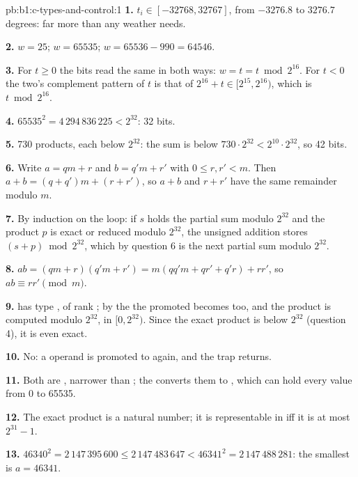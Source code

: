 \begin{solution}{pb:b1:c-types-and-control:1}
\textbf{1.} $t_i \in [-32768, 32767]$, from $-3276.8$ to $3276.7$ degrees: far more than any weather needs.

\textbf{2.} $w = 25$; $w = 65535$; $w = 65536 - 990 = 64546$.

\textbf{3.} For $t \geq 0$ the bits read the same in both ways: $w = t = t \bmod 2^{16}$. For $t < 0$ the two's
complement pattern of $t$ is that of $2^{16} + t \in [2^{15}, 2^{16})$, which is $t \bmod 2^{16}$.

\textbf{4.} $65535^2 = 4\,294\,836\,225 < 2^{32}$: 32 bits.

\textbf{5.} 730 products, each below $2^{32}$: the sum is below $730 \cdot 2^{32} < 2^{10} \cdot 2^{32}$, so 42 bits.

\textbf{6.} Write $a = qm + r$ and $b = q'm + r'$ with $0 \leq r, r' < m$. Then $a + b = (q + q')m + (r + r')$, so $a + b$
and $r + r'$ have the same remainder modulo $m$.

\textbf{7.} By induction on the loop: if $s$ holds the partial sum modulo $2^{32}$ and the product $p$ is exact or
reduced modulo $2^{32}$, the unsigned addition stores $(s + p) \bmod 2^{32}$, which by question 6 is the next partial
sum modulo $2^{32}$.

\textbf{8.} $ab = (qm + r)(q'm + r') = m(qq'm + qr' + q'r) + rr'$, so $ab \equiv rr' \pmod m$.

\textbf{9.}  has type , of rank ; by the  the promoted  becomes  too, and the product is computed modulo $2^{32}$,
in $[0, 2^{32})$. Since the exact product is below $2^{32}$ (question 4), it is even exact.

\textbf{10.} No: a  operand is promoted to  again, and the trap returns.

\textbf{11.} Both are , narrower than ; the  converts them to ,
which can hold every value from 0 to 65535.

\textbf{12.} The exact product is a natural number; it is representable in  iff it is at most
$2^{31} - 1$.

\textbf{13.} $46340^2 = 2\,147\,395\,600 \leq 2\,147\,483\,647 < 46341^2 = 2\,147\,488\,281$: the smallest is $a = 46341$.


\end{solution}
